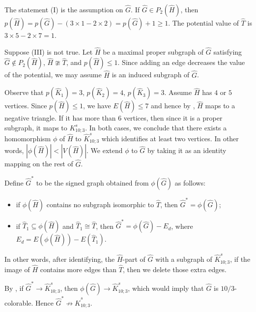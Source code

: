 \documentclass[10pt,a4paper]{amsart}
\makeatletter
\renewenvironment{proof}[1][\proofname]{\par
	\pushQED{\qed}%
	\normalfont \topsep6\p@\@plus6\p@\relax
	\trivlist
	\item[\hskip\labelsep
	\bfseries
	#1\@addpunct{.}]\ignorespaces
}{%
	\popQED\endtrivlist\@endpefalse
}
\makeatother
\begin{document}
\begin{proof}
	The statement (I) is the assumption on $\widehat{G}$.
	If $\widehat{G}\in P_2(\widehat{H})$, then $p(\widehat{H})=p(\widehat{G})-(3\times 1-2\times 2)=p(\widehat{G})+1\ge 1$. The potential value of $\widehat{T}$ is $3\times 5-2\times 7=1$.
	
	
	Suppose (III) is not true. Let $\widehat{H}$ be a maximal proper subgraph of $\widehat{G}$ satisfying $\widehat{G} \not\in P_2(\widehat{H})$, $\widehat{H}\ncong \widehat{T}$, and $p(\widehat{H})\leq 1$. Since adding an edge decreases the value of the potential, we may assume $\widehat{H}$ is an induced subgraph of $\widehat{G}$. 
	
	
	Observe that $p(\widehat{K}_1)=3$, $p(\widehat{K}_2)=4$, $p(\widehat{K}_3)=3$. Assume $\widehat{H}$ has $4$ or $5$ vertices. Since $p(\widehat{H})\leq 1$, we have $E(\widehat{H})\leq 7$ and hence  by , $\widehat{H}$ maps to a negative triangle. If it has more than $6$ vertices, then since it is a proper subgraph, it maps to $K_{10;3}^{s}$. In both cases, we conclude that there exists a homomorphism $\phi$ of $\widehat{H}$ to $\widehat{K}^s_{10;3}$ which identifies at least two vertices. In other words, $|\phi(\widehat{H})|<|V(\widehat{H})|$.
	We extend $\phi$ to $\widehat{G}$ by taking it as an identity mapping on the rest of $\widehat{G}$.
	
	
	
	Define $\widehat{G}^*$ to be the signed graph obtained from $\phi(\widehat{G})$ as follows: 
	\begin{itemize}
		\item if $\phi(\widehat{H})$ contains no subgraph isomorphic to $\widehat{T}$, then $\widehat{G}^*=\phi(\widehat{G})$;
		\item if $\widehat{T}_{1}\subseteq \phi(\widehat{H})$ and $\widehat{T}_1\cong \widehat{T}$, then $\widehat{G}^*=\phi(\widehat{G})-E_d$, where $E_d=E(\phi(\widehat{H}))-E(\widehat{T}_{1})$.
	\end{itemize}
	
	In other words, after identifying,  the $\widehat{H}$-part of $\widehat{G}$ with a subgraph of  $\widehat{K}^{s}_{10;3}$, if the image of $\widehat{H}$ contains more edges than $\widehat{T}$, then we delete those extra edges.
	
	
	
	By , if $\widehat{G}^*\to \widehat{K}^s_{10;3}$, then $\phi(\widehat{G})\to \widehat{K}^s_{10;3}$, which would imply that $\widehat{G}$ is $10/3$-colorable. Hence $\widehat{G}^*\not\to \widehat{K}^s_{10;3}$. 
	

\end{proof}
\end{document}
